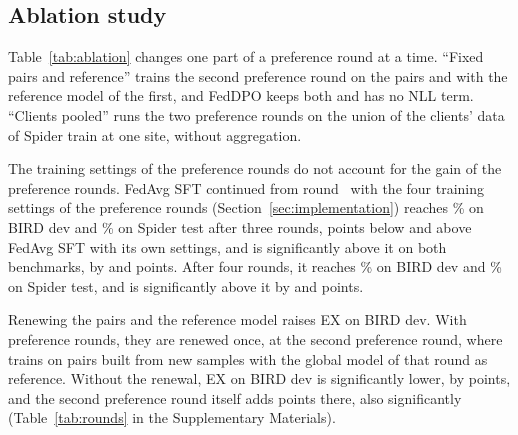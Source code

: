 \subsection{Ablation study}\label{sec:ablation}

\begin{table}[!ht]
\caption{Ablation study: EX (\%) on ~BIRD dev and
~Spider test, each with the rows run on that benchmark. $\Delta$
and $p$ compare each row with \method{} after the same number of rounds,
as in Table~\ref{tab:main}. Every row starts from the FedAvg SFT model
after  rounds, listed first. ``Preference-round
settings'' continues FedAvg SFT with the training settings of the
preference rounds, and after three rounds the row without the NLL term
is the first round of FedDPO.}\label{tab:ablation}
\footnotesize

\end{table}

Table~\ref{tab:ablation} changes one part of a preference round at a
time. ``Fixed pairs and reference'' trains the second preference round
on the pairs and with the reference model of the first, and FedDPO keeps
both and has no NLL term. ``Clients pooled'' runs the two preference
rounds on the union of the clients' data of Spider train at one site,
without aggregation.

The training settings of the preference rounds do not account for the
gain of the preference rounds. FedAvg SFT continued from round~ with the
four training settings of the preference rounds
(Section~\ref{sec:implementation}) reaches \% on
BIRD dev and \% on Spider test after three rounds,
 points below and
 above FedAvg SFT with its own
settings, and \method{} is significantly above it on both benchmarks, by
 and 
points. After four rounds, it reaches
\% on BIRD dev and \% on
Spider test, and \method{} is significantly above it by
 and 
points.

Renewing the pairs and the reference model raises EX on BIRD dev. With
 preference rounds, they are renewed once, at the
second preference round, where \method{} trains on pairs built from new
samples with the global model of that round as reference. Without the
renewal, EX on BIRD dev is significantly lower, by
 points, and the second preference round
itself adds  points there, also significantly
(Table~\ref{tab:rounds} in the Supplementary Materials).

